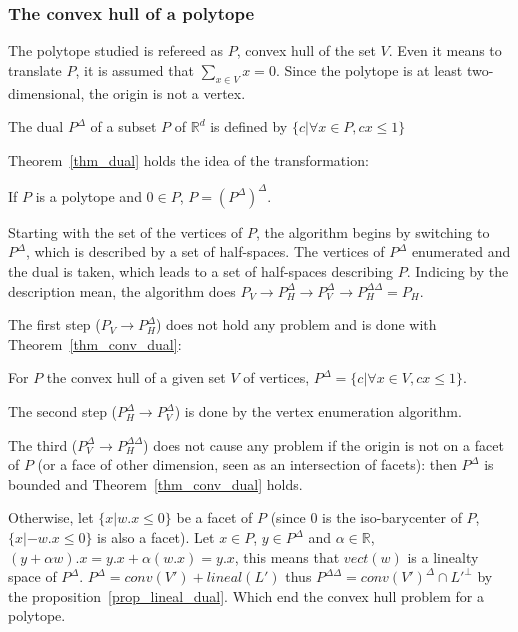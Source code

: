 \subsubsection{The convex hull of a polytope}
The polytope studied is refereed as $P$, convex hull of the set $V$. Even it means to translate $P$, it is assumed that $\sum_{x\in V} x = 0 $. Since the polytope is at least two-dimensional, the origin is not a vertex. 

\begin{definition}
The dual $P^\Delta$ of a subset $P$ of $\mathbb{R}^d$ is defined by $\{c | \forall x \in P, cx\leq 1  \}$
\end{definition}

Theorem~\ref{thm_dual} holds the idea of the transformation:

\begin{theorem}
If $P$ is a polytope and $0\in P$, $P=(P^\Delta)^\Delta$.
\label{thm_dual}
\end{theorem}

Starting with the set of the vertices of $P$, the algorithm begins by switching to $P^\Delta$, which is described by a set of half-spaces. The vertices of $P^\Delta$ enumerated and the dual is taken, which leads to a set of half-spaces describing $P$. Indicing by the description mean, the algorithm does $ P_V \rightarrow P_H^\Delta \rightarrow P_V^\Delta \rightarrow P_H^{\Delta\Delta} = P_H $. 

The first step ($P_V \rightarrow P_H^\Delta$) does not hold any problem and is done with Theorem~\ref{thm_conv_dual}:
\begin{theorem}
For $P$ the convex hull of a given set $V$ of vertices, $P^\Delta=\{c | \forall x \in V, cx\leq 1\}$.
\label{thm_conv_dual}
\end{theorem}
The second step ($P_H^\Delta \rightarrow P_V^\Delta$) is done by the vertex enumeration algorithm. 

The third ($P_V^\Delta \rightarrow P_H^{\Delta\Delta}$) does not cause any problem if the origin is not on a facet of $P$ (or a face of other dimension, seen as an intersection of facets): then $P^\Delta$ is bounded and Theorem~\ref{thm_conv_dual} holds.

Otherwise, let $\{x|w.x \leq 0\}$ be a facet of $P$ (since $0$ is the iso-barycenter of $P$, $\{x| -w.x \leq 0\}$ is also a facet). Let $x\in P$, $y\in P^\Delta$ and $\alpha\in\mathbb{R}$, $(y+\alpha w).x=y.x+\alpha(w.x)=y.x$, this means that $vect(w)$ is a linealty space of $P^\Delta$. $P^\Delta=conv(V')+lineal(L')$ thus $P^{\Delta\Delta}=conv(V')^\Delta \cap L'^\bot$ by the proposition~\ref{prop_lineal_dual}. Which end the convex hull problem for a polytope.

